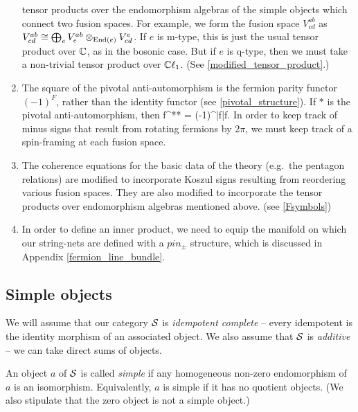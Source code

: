 \begin{enumerate}
	tensor products over the endomorphism algebras of the simple objects which connect two fusion spaces. 
	For example, we form the fusion space $V^{ab}_{cd}$ as $V^{ab}_{cd} \cong \bigoplus_e V^{ab}_e \otimes_{\text{End}(e)} V^e_{cd}$.
	If $e$ is m-type, this is just the usual tensor product over $\mathbb{C}$, as in the bosonic case.
	But if $e$ is q-type, then we must take a non-trivial tensor product over $\mathbb{C}\ell_1$.
	(See \ref{modified_tensor_product}.)
	\item The square of the pivotal anti-automorphism is 
	the fermion parity functor $(-1)^F$, rather than the identity functor (see \ref{pivotal_structure}). 
	If $*$ is the pivotal anti-automorphism, then 
	\be f^{**} = (-1)^{|f|}f.\ee
	In order to keep track of minus signs that result from rotating fermions by $2\pi$, we must keep track of a spin-framing at each fusion space. 
	\item The coherence equations for the basic data of the theory (e.g.\ the pentagon relations) are modified to incorporate  
	 Koszul signs resulting from reordering various fusion spaces. 
	 They are also modified to incorporate the tensor products over endomorphism algebras mentioned above. (see \ref{Fsymbols})
	\item In order to define an inner product, we need to equip the manifold on which our string-nets are 
	defined with a $pin_\pm$ structure, which is discussed in Appendix \ref{fermion_line_bundle}.
\end{enumerate}





\subsection{Simple objects}  \label{def_sob_ss}

We will assume that our category $\mathcal{S}$ is {\it idempotent complete} -- 
every idempotent is the identity morphism of an associated object.
We also assume that $\mathcal{S}$ is {\it additive} -- we can take direct sums of objects.

An object $a$ of $\mathcal{S}$ is called {\it simple} if any homogeneous non-zero endomorphism of $a$ is an isomorphism.
Equivalently, $a$ is simple if it has no quotient objects.
(We also stipulate that the zero object is not a simple object.)

